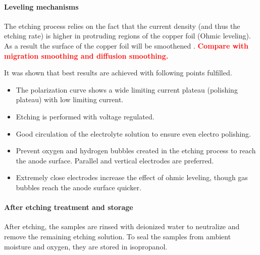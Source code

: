 \paragraph{Leveling mechanisms}
The etching process relies on the fact that the current density (and thus the etching rate) is higher in protruding regions of the copper foil (Ohmic leveling). As a result the surface of the copper foil will be smoothened \cite{luo_effect_2011}. \textcolor{red}{\textbf{Compare with migration smoothing and diffusion smoothing\cite{jinshan_electrochemical_2004, Huo_Electrochemistry_2007}.}}

It was shown that best results are achieved with following points fulfilled.\cite{Huo_Electrochemical_2003}
\begin{itemize}
	\item The polarization curve shows a wide limiting current plateau (polishing plateau) with low limiting current.
	\item Etching is performed with voltage regulated.
	\item Good circulation of the electrolyte solution to ensure even electro polishing.
	\item Prevent oxygen and hydrogen bubbles created in the etching process to reach the anode surface. Parallel and vertical electrodes are preferred.
	\item Extremely close electrodes increase the effect of ohmic leveling, though gas bubbles reach the anode surface quicker.
\end{itemize}

\paragraph{After etching treatment and storage}
After etching, the samples are rinsed with deionized water to neutralize and remove the remaining etching solution. To seal the samples from ambient moisture and oxygen, they are stored in isopropanol.


